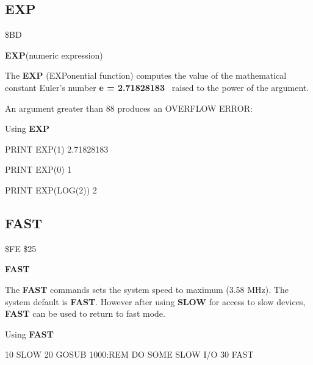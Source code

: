 
\newpage
\subsection{EXP}
\begin{description}[leftmargin=3cm,style=nextline]
\item [Token:] \$BD
\item [Format:] {\bf EXP}(numeric expression)
\item [Usage:] The {\bf EXP} (EXPonential function) computes
               the value of the mathematical constant
               Euler's number {\bf e = 2.71828183}
               raised to the power of the
               argument.

\item [Remarks:] An argument greater than 88 produces
                 an OVERFLOW ERROR:
\item [Example:] Using {\bf EXP}
\begin{screenoutput}
PRINT EXP(1)
 2.71828183

PRINT EXP(0)
 1

PRINT EXP(LOG(2))
 2
\end{screenoutput}
\end{description}


\newpage
\subsection{FAST}
\begin{description}[leftmargin=3cm,style=nextline]
\item [Token:] \$FE \$25
\item [Format:] {\bf FAST}
\item [Usage:] The {\bf FAST} commands sets the system speed
               to maximum (3.58 MHz).
               The system default is {\bf FAST}.
               However after using {\bf SLOW} for access to
               slow devices, {\bf FAST} can be used to return
               to fast mode.

\item [Example:] Using {\bf FAST}
\begin{screenoutput}
10 SLOW
20 GOSUB 1000:REM DO SOME SLOW I/O
30 FAST
\end{screenoutput}
\end{description}


